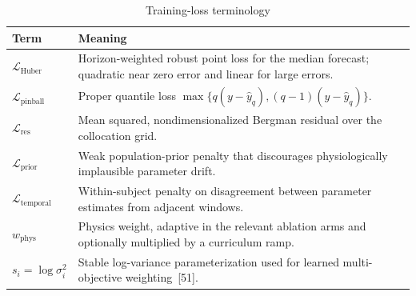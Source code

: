 \documentclass[10pt]{article}
\begin{document}
\begin{table}[h!]
\centering
\caption{Training-loss terminology}
\label{tab:loss}
\footnotesize
\begin{tabular}{lp{13cm}}
\toprule
Term & Meaning \\
\midrule
$\mathcal{L}_{\text{Huber}}$ & Horizon-weighted robust point loss for the median forecast; quadratic near zero error and linear for large errors. \\
$\mathcal{L}_{\text{pinball}}$ & Proper quantile loss $\max\{q(y-\hat{y}_q), (q-1)(y-\hat{y}_q)\}$. \\
$\mathcal{L}_{\text{res}}$ & Mean squared, nondimensionalized Bergman residual over the collocation grid. \\
$\mathcal{L}_{\text{prior}}$ & Weak population-prior penalty that discourages physiologically implausible parameter drift. \\
$\mathcal{L}_{\text{temporal}}$ & Within-subject penalty on disagreement between parameter estimates from adjacent windows. \\
$w_{\text{phys}}$ & Physics weight, adaptive in the relevant ablation arms and optionally multiplied by a curriculum ramp. \\
$s_i = \log\sigma_i^2$ & Stable log-variance parameterization used for learned multi-objective weighting~[51]. \\
\bottomrule
\end{tabular}
\end{table}
\end{document}
